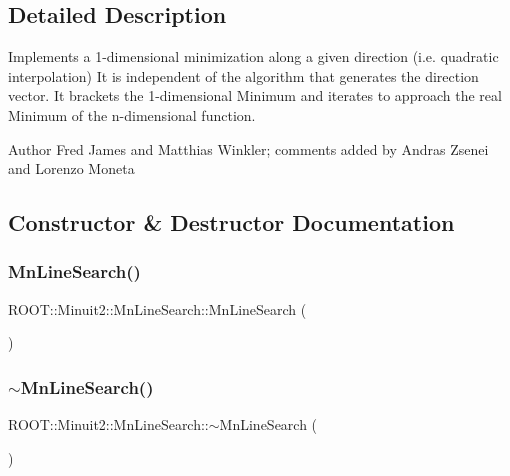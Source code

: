 \subsection{Detailed Description}
Implements a 1-\/dimensional minimization along a given direction (i.\+e. quadratic interpolation) It is independent of the algorithm that generates the direction vector. It brackets the 1-\/dimensional Minimum and iterates to approach the real Minimum of the n-\/dimensional function.

\begin{DoxyAuthor}{Author}
Fred James and Matthias Winkler; comments added by Andras Zsenei and Lorenzo Moneta 
\end{DoxyAuthor}


\subsection{Constructor \& Destructor Documentation}
\mbox{\label{classROOT_1_1Minuit2_1_1MnLineSearch_ac8e8d450c628b3af3becdfc1badd0180}} 
\subsubsection{\texorpdfstring{MnLineSearch()}{MnLineSearch()}\hspace{0.1cm}{\footnotesize\ttfamily [1/2]}}
{\footnotesize\ttfamily R\+O\+O\+T\+::\+Minuit2\+::\+Mn\+Line\+Search\+::\+Mn\+Line\+Search (\begin{DoxyParamCaption}{ }\end{DoxyParamCaption})\hspace{0.3cm}{\ttfamily [inline]}}

\mbox{\label{classROOT_1_1Minuit2_1_1MnLineSearch_a84ecd0790b8822023e2e1d7abb102f6c}} 
\subsubsection{\texorpdfstring{$\sim$MnLineSearch()}{~MnLineSearch()}\hspace{0.1cm}{\footnotesize\ttfamily [1/2]}}
{\footnotesize\ttfamily R\+O\+O\+T\+::\+Minuit2\+::\+Mn\+Line\+Search\+::$\sim$\+Mn\+Line\+Search (\begin{DoxyParamCaption}{ }\end{DoxyParamCaption})\hspace{0.3cm}{\ttfamily [inline]}}

